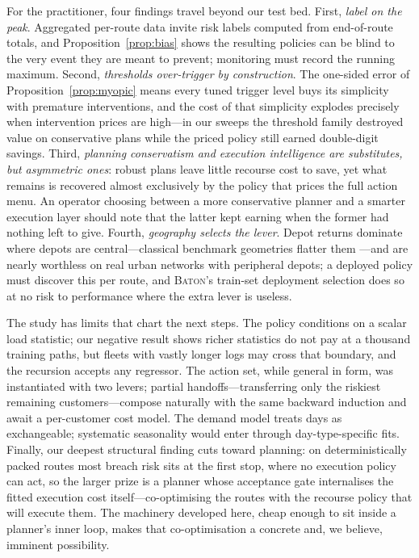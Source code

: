 \documentclass[preprint,authoryear,12pt]{elsarticle}
\theoremstyle{definition}
\theoremstyle{remark}
\begin{document}
For the practitioner, four findings travel beyond our test bed. First,
\emph{label on the peak}. Aggregated per-route data invite risk labels
computed from end-of-route totals, and Proposition~\ref{prop:bias}
shows the resulting policies can be blind to the very event they are
meant to prevent; monitoring must record the running maximum. Second,
\emph{thresholds over-trigger by construction}. The one-sided error of
Proposition~\ref{prop:myopic} means every tuned trigger level buys its
simplicity with premature interventions, and the cost of that
simplicity explodes precisely when intervention prices are high---in
our sweeps the threshold family destroyed value on conservative plans
while the priced policy still earned double-digit savings. Third,
\emph{planning conservatism and execution intelligence are
substitutes, but asymmetric ones}: robust plans leave little recourse
cost to save, yet what remains is recovered almost exclusively by the
policy that prices the full action menu. An operator choosing between a
more conservative planner and a smarter execution layer should note
that the latter kept earning when the former had nothing left to give.
Fourth, \emph{geography selects the lever}. Depot returns dominate
where depots are central---classical benchmark geometries flatter them
---and are nearly worthless on real urban networks with peripheral
depots; a deployed policy must discover this per route, and
\textsc{Baton}'s train-set deployment selection does so at no risk to
performance where the extra lever is useless.

The study has limits that chart the next steps. The policy conditions
on a scalar load statistic; our negative result shows richer statistics
do not pay at a thousand training paths, but fleets with vastly longer
logs may cross that boundary, and the recursion accepts any regressor.
The action set, while general in form, was instantiated with two
levers; partial handoffs---transferring only the riskiest remaining
customers---compose naturally with the same backward induction and
await a per-customer cost model. The demand model treats days as
exchangeable; systematic seasonality would enter through
day-type-specific fits. Finally, our deepest structural finding cuts
toward planning: on deterministically packed routes most breach risk
sits at the first stop, where no execution policy can act, so the
larger prize is a planner whose acceptance gate internalises the fitted
execution cost itself---co-optimising the routes with the recourse
policy that will execute them. The machinery developed here, cheap
enough to sit inside a planner's inner loop, makes that co-optimisation
a concrete and, we believe, imminent possibility.
\end{document}
